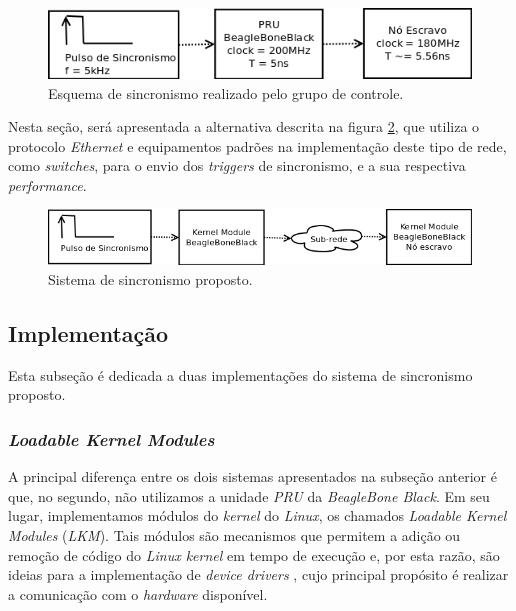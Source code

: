 \begin{figure}[h]

\centering
\includegraphics[scale=0.65]{image/pru_bbb_sincronismo}
\caption {Esquema de sincronismo realizado pelo grupo de controle.}
\label{fig:pru_sincronismo}
\end{figure}

\vspace{12pt}

Nesta seção, será apresentada a alternativa descrita na figura
\ref{fig:pru_sincronismo_ethernet}, que utiliza o protocolo \textit{Ethernet} e
equipamentos padrões na implementação deste tipo de rede, como
\textit{switches}, para o envio dos \textit{triggers} de sincronismo, e a sua
respectiva \textit{performance}.

\begin{figure}[h]

\centering
\includegraphics[scale=0.65]{image/pru_bbb_sincronismo_ethernet}
\caption {Sistema de sincronismo proposto.}
\label{fig:pru_sincronismo_ethernet}
\end{figure}

\subsection {Implementação}

Esta subseção é dedicada a duas implementações do sistema de sincronismo
proposto.

\subsubsection{\textit{Loadable Kernel Modules}}

A principal diferença entre os dois sistemas apresentados na subseção anterior é
que, no segundo, não utilizamos a unidade \textit{PRU} da \textit{BeagleBone
Black}. Em seu lugar, implementamos módulos do \textit{kernel} do
\textit{Linux}, os chamados \textit{Loadable Kernel Modules} (\textit{LKM}).
Tais módulos são mecanismos que permitem a adição ou remoção de código do \textit{Linux kernel}
em tempo de execução e, por esta razão, são ideias para a implementação de
\textit{device drivers} \cite{derek}, cujo principal propósito é realizar a
comunicação com o \textit{hardware} disponível.  

